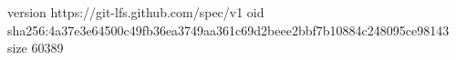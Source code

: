 version https://git-lfs.github.com/spec/v1
oid sha256:4a37e3e64500c49fb36ea3749aa361c69d2beee2bbf7b10884c248095ce98143
size 60389
